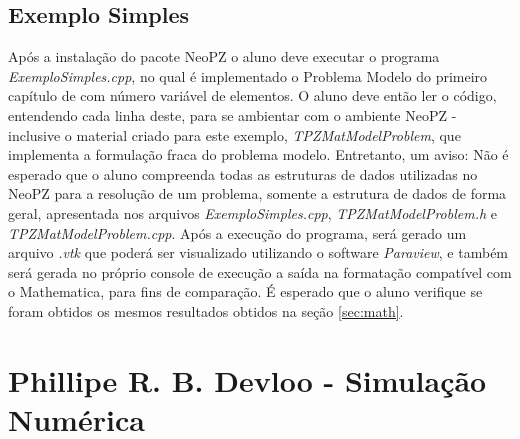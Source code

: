 \documentclass[11pt, oneside, hidelinks]{article}   	%
\begin{document}
\subsection{Exemplo Simples}
Após a instalação do pacote NeoPZ o aluno deve executar o programa \emph{ExemploSimples.cpp}, no qual é implementado o Problema Modelo do primeiro capítulo de \citet{oden81} com número variável de elementos. O aluno deve então ler o código, entendendo cada linha deste, para se ambientar com o ambiente NeoPZ - inclusive o material criado para este exemplo, \emph{TPZMatModelProblem}, que implementa a formulação fraca do problema modelo. Entretanto, um aviso: Não é esperado que o aluno compreenda todas as estruturas de dados utilizadas no NeoPZ para a resolução de um problema, somente a estrutura de dados de forma geral, apresentada nos arquivos \emph{ExemploSimples.cpp}, \emph{TPZMatModelProblem.h} e  \emph{TPZMatModelProblem.cpp}. Após a execução do programa, será gerado um arquivo \emph{.vtk} que poderá ser visualizado utilizando o software \emph{Paraview}, e também será gerada no próprio console de execução a saída na formatação compatível com o Mathematica, para fins de comparação. É esperado que o aluno verifique se foram obtidos os mesmos resultados obtidos na seção \ref{sec:math}.
\newpage


\newpage
\appendix
\section{Phillipe R. B. Devloo - Simulação Numérica}\label{app:devloo}

\end{document}
